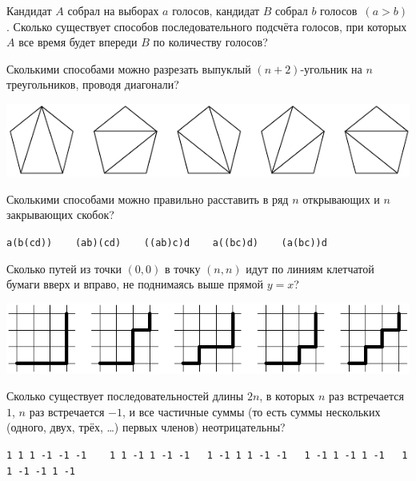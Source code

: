 \documentclass[a4paper,12pt]{article}\usepackage{newlistok}
\begin{document}
 Кандидат $A$ собрал на выборах $a$ голосов,
кандидат $B$ собрал $b$ голосов~\hbox{$(a>b)$.}
Сколько существует способов последовательного подсчёта голосов, при
которых $A$ все время будет впереди $B$ по количеству голосов?


\label{katalan}
Сколькими способами можно разрезать выпуклый $(n+2)$-угольник
на $n$ треугольников, проводя диагонали?

\vspace*{1mm}
\centerline{\includegraphics{cat-1}}
 Сколькими способами можно правильно расставить
в ряд $n$ открывающих и $n$ закрывающих скобок?

\centerline{\texttt{a(b(cd)) \ \ \ (ab)(cd) \ \ \ ((ab)c)d \ \ \ a((bc)d) \ \ \ (a(bc))d}}
\vspace*{1mm}

 Сколько путей из точки $(0,0)$ в точку $(n,n)$ идут по линиям
клетчатой бумаги вверх и вправо, не поднимаясь
выше прямой $y=x$?

\vspace*{1mm}
\centerline{\includegraphics{cat-2}}

 Сколько существует последовательностей длины $2n$, в которых $n$ раз
встречается $1$, $n$ раз встречается $-1$, и все частичные
суммы (то есть суммы нескольких (одного, двух, трёх, \dots) первых членов) %
неотрицательны?

\vspace*{1mm}
\centerline{\texttt{1 1 1 {-1} {-1} {-1} \ \ \ 1 1 {-1} 1 {-1} {-1}\ \ \ 1 {-1} 1 1 {-1}
{-1}\ \ \ 1 {-1} 1 {-1} 1 {-1}\ \ \ 1 1 {-1} {-1} 1 {-1}}}
\vspace*{1mm}
\end{document}
